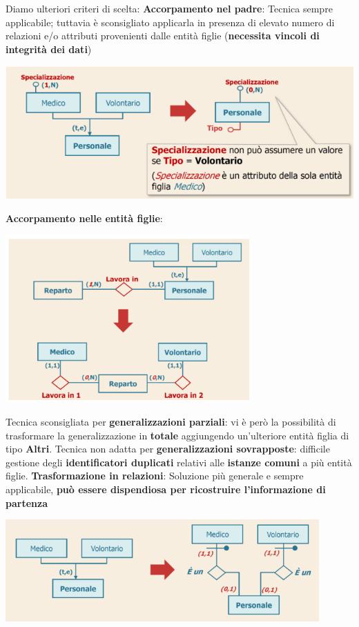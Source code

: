 \documentclass[12pt]{article}
\begin{document}
Diamo ulteriori criteri di scelta: \newline
\textbf{Accorpamento nel padre}: Tecnica sempre applicabile; tuttavia è sconsigliato applicarla in presenza di elevato numero di relazioni e/o attributi provenienti dalle entità figlie (\textbf{necessita vincoli di integrità dei dati})
\begin{center}
    \includegraphics[width = 1\textwidth]{Images/102.PNG}
\end{center}
\textbf{Accorpamento nelle entità figlie}:
\begin{center}
    \includegraphics[width = 0.70\textwidth]{Images/103.PNG}
\end{center}
Tecnica sconsigliata per \textbf{generalizzazioni parziali}: vi è però la possibilità di trasformare la generalizzazione in \textbf{totale} aggiungendo un'ulteriore entità figlia di tipo \textbf{Altri}. \newline
Tecnica non adatta per \textbf{generalizzazioni sovrapposte}: difficile gestione degli \textbf{identificatori duplicati} relativi alle \textbf{istanze comuni} a più entità figlie. \newline
\textbf{Trasformazione in relazioni}: Soluzione più generale e sempre applicabile, \textbf{può essere dispendiosa per ricostruire l'informazione di partenza}
\begin{center}
    \includegraphics[width = 0.90\textwidth]{Images/104.PNG}
\end{center}
\end{document}
